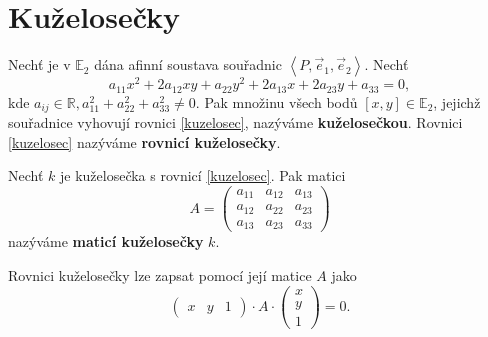 \section{Kuželosečky}
\begin{definition}
    Nechť je v $\mathbb E_2$ dána afinní soustava souřadnic $\left < P,\vec e_1, \vec e_2 \right > $.
    Nechť
    \begin{equation}\label{kuzelosec}
        a_{11}x^2+2a_{12}xy+a_{22}y^2+2a_{13}x+2a_{23}y+a_{33}=0,
    \end{equation}
    kde $a_{ij}\in \mathbb R, a_{11}^2 + a_{22}^2 + a_{33}^2\ne 0.$ Pak množinu všech
    bodů $[x,y] \in \mathbb E_2$, jejichž souřadnice vyhovují rovnici \ref{kuzelosec},
    nazýváme \textbf{kuželosečkou}. Rovnici \ref{kuzelosec} nazýváme \textbf{rovnicí kuželosečky}.
\end{definition}

\begin{definition}
    Nechť $k$ je kuželosečka s rovnicí \ref{kuzelosec}. Pak matici
    $$
        A = \begin{pmatrix}
            a_{11} & a_{12} & a_{13} \\
            a_{12} & a_{22} & a_{23} \\
            a_{13} & a_{23} & a_{33}
        \end{pmatrix}
    $$
    nazýváme \textbf{maticí kuželosečky} $k$.
\end{definition}

\begin{pozn}
    Rovnici kuželosečky lze zapsat pomocí její matice $A$ jako
    $$\begin{pmatrix}
        x & y & 1
    \end{pmatrix}\cdot A \cdot \begin{pmatrix}
        x\\
        y\\
        1
    \end{pmatrix}=0.$$
\end{pozn}

